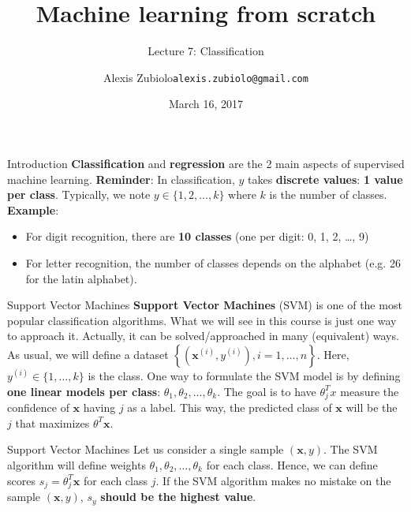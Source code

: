 \documentclass{beamer}
\title{Machine learning from scratch}
\subtitle{Lecture 7: Classification}
\author{Alexis Zubiolo\newline\texttt{alexis.zubiolo@gmail.com}}
\institute{Data Science Team Lead @ Adcash}
\date{March 16, 2017}
\newcommand{\1}[1]{\mathbbm{1}\left[#1\right]}
\newcommand{\yi}{y^{(i)}}
\newcommand{\bx}{\bm{x}}
\newcommand{\bxi}{\bx^{(i)}}
\newcommand{\pv}{\pause\vfill}
\begin{document}
\begin{frame}
  \titlepage
\end{frame}

\begin{frame}{Introduction}
\textbf{Classification} and \textbf{regression} are the 2 main aspects of supervised machine learning.
\pv
\textbf{Reminder}: In classification, $y$ takes \textbf{discrete values}: \textbf{1 value per class}. Typically, we note $y \in \{1, 2, \dots, k \}$ where $k$ is the number of classes.
\pv
\textbf{Example}: 
\begin{itemize}
	\item For digit recognition, there are \textbf{10 classes} (one per digit: 0, 1, 2, \ldots, 9)
	\item For letter recognition, the number of classes depends on the alphabet (e.g. 26 for the latin alphabet).
\end{itemize}
\end{frame}

\begin{frame}{Support Vector Machines}
\textbf{Support Vector Machines} (SVM) is one of the most popular classification algorithms. What we will see in this course is just one way to approach it. Actually, it can be solved/approached in many (equivalent) ways.
\pv
As usual, we will define a dataset $\left\{ (\bxi, \yi), i =1, \dots, n\right\}$. Here, $\yi \in \{ 1, \dots, k\}$ is the class.
\pv
One way to formulate the SVM model is by defining \textbf{one linear models per class}: $\theta_1, \theta_2, \dots, \theta_k$. The goal is to have $\theta_j^T x$ measure the confidence of $\bx$ having $j$ as a label. This way, the predicted class of $\bx$ will be the $j$ that maximizes $\theta^T \bx$.
\end{frame}

\begin{frame}{Support Vector Machines}
Let us consider a single sample $(\bx, y)$. The SVM algorithm will define weights $\theta_1, \theta_2, \dots, \theta_k$ for each class.
\pv
Hence, we can define scores $s_j = \theta_j^T \bx$ for each class $j$. If the SVM algorithm makes no mistake on the sample $(\bx, y)$, $s_y$ \textbf{should be the highest value}.
\end{frame}
\end{document}
